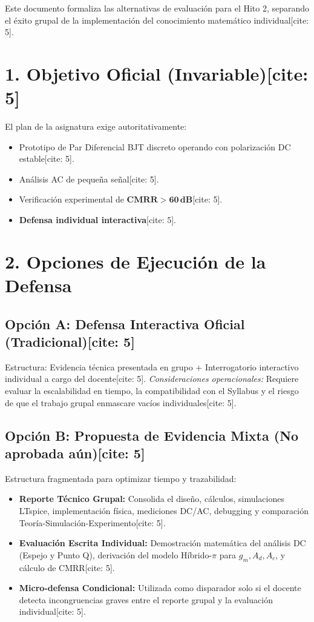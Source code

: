 \documentclass[11pt, a4paper]{article}
\begin{document}
\begin{tcolorbox}[colback=red!5, colframe=red!70!black, title=\textbf{Documento Interno Docente: Formato de Evaluación - Hito 2}]
    Este documento formaliza las alternativas de evaluación para el Hito 2, separando el éxito grupal de la implementación del conocimiento matemático individual[cite: 5].
\end{tcolorbox}

\section*{1. Objetivo Oficial (Invariable)[cite: 5]}
El plan de la asignatura exige autoritativamente:
\begin{itemize}
    \item Prototipo de Par Diferencial BJT discreto operando con polarización DC estable[cite: 5].
    \item Análisis AC de pequeña señal[cite: 5].
    \item Verificación experimental de $\mathbf{CMRR > 60\,\text{dB}}$[cite: 5].
    \item \textbf{Defensa individual interactiva}[cite: 5].
\end{itemize}

\section*{2. Opciones de Ejecución de la Defensa}

\subsection*{Opción A: Defensa Interactiva Oficial (Tradicional)[cite: 5]}
Estructura: Evidencia técnica presentada en grupo $+$ Interrogatorio interactivo individual a cargo del docente[cite: 5].
\textit{Consideraciones operacionales:} Requiere evaluar la escalabilidad en tiempo, la compatibilidad con el Syllabus y el riesgo de que el trabajo grupal enmascare vacíos individuales[cite: 5].

\subsection*{Opción B: Propuesta de Evidencia Mixta (\textbf{No aprobada aún})[cite: 5]}
Estructura fragmentada para optimizar tiempo y trazabilidad:
\begin{itemize}
    \item \textbf{Reporte Técnico Grupal:} Consolida el diseño, cálculos, simulaciones LTspice, implementación física, mediciones DC/AC, debugging y comparación Teoría-Simulación-Experimento[cite: 5].
    \item \textbf{Evaluación Escrita Individual:} Demostración matemática del análisis DC (Espejo y Punto Q), derivación del modelo Híbrido-$\pi$ para $g_m, A_d, A_c$, y cálculo de CMRR[cite: 5].
    \item \textbf{Micro-defensa Condicional:} Utilizada como disparador solo si el docente detecta incongruencias graves entre el reporte grupal y la evaluación individual[cite: 5].
\end{itemize}
\end{document}
